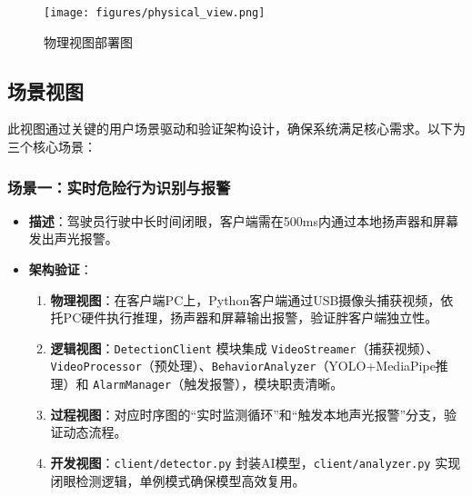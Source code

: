 \documentclass[a4paper,12pt]{article}
\begin{document}
\begin{figure}[h]
  \centering
  \texttt{[image: figures/physical\_view.png]}
  \caption{物理视图部署图}
  \label{fig:physical_view}
\end{figure}

\subsection{场景视图}
此视图通过关键的用户场景驱动和验证架构设计，确保系统满足核心需求。以下为三个核心场景：

\subsubsection{场景一：实时危险行为识别与报警}
\begin{itemize}
  \item \textbf{描述}：驾驶员行驶中长时间闭眼，客户端需在500ms内通过本地扬声器和屏幕发出声光报警。
  \item \textbf{架构验证}：
    \begin{enumerate}
      \item \textbf{物理视图}：在客户端PC上，Python客户端通过USB摄像头捕获视频，依托PC硬件执行推理，扬声器和屏幕输出报警，验证胖客户端独立性。
      \item \textbf{逻辑视图}：\texttt{DetectionClient} 模块集成 \texttt{VideoStreamer}（捕获视频）、\texttt{VideoProcessor}（预处理）、\texttt{BehaviorAnalyzer}（YOLO+MediaPipe推理）和 \texttt{AlarmManager}（触发报警），模块职责清晰。
      \item \textbf{过程视图}：对应时序图的“实时监测循环”和“触发本地声光报警”分支，验证动态流程。
      \item \textbf{开发视图}：\texttt{client/detector.py} 封装AI模型，\texttt{client/analyzer.py} 实现闭眼检测逻辑，单例模式确保模型高效复用。
    \end{enumerate}
\end{itemize}
\end{document}
